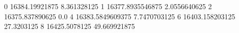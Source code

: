 0 16384.19921875 8.361328125
1 16377.8935546875 2.0556640625
2 16375.837890625 0.0
4 16383.5849609375 7.7470703125
6 16403.158203125 27.3203125
8 16425.5078125 49.669921875
